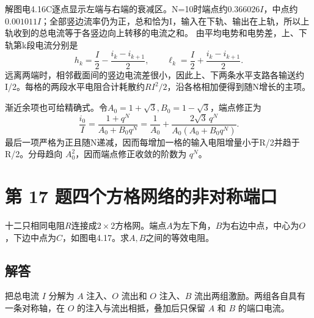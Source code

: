 \documentclass[UTF8,fontset=fandol,a4paper,11pt]{ctexart}
\newcommand{\figcaption}[1]{\par\vspace{2pt}{\small\color{muted}#1}\par}
\begin{document}
解图电4.16C逐点显示左端与右端的衰减区。N=10时端点约$0.366026I$，中点约$0.001011I$；全部竖边流率仍为正，总和恰为I，输入在下轨、输出在上轨，所以上轨收到的总电流等于各竖边向上转移的电流之和。
由平均电势和电势差，上、下轨第k段电流分别是
\[
h_k=\frac I2-\frac{i_k-i_{k+1}}2,\qquad
\ell_k=\frac I2+\frac{i_k-i_{k+1}}2.
\]
远离两端时，相邻截面间的竖边电流差很小，因此上、下两条水平支路各输送约I/2。每格的两段水平电阻合计耗散约$RI^2/2$，沿各格相加便得到随N增长的主项。

渐近余项也可给精确式。令$A_0=1+\sqrt3,B_0=1-\sqrt3$，端点修正为
\[
\frac{i_0}{I}=\frac{1+q^N}{A_0+B_0q^N}
=\frac1{A_0}+\frac{2\sqrt3\,q^N}{A_0(A_0+B_0q^N)}.
\]
最后一项严格为正且随N递减，因而每增加一格的输入电阻增量小于R/2并趋于R/2。分母趋向 $A_0^2$，因而端点修正收敛的阶数为 $q^N$。




\section*{第 17 题\quad 四个方格网络的非对称端口}\label{q:17}

十二只相同电阻$R$连接成$2\times2$方格网。端点$A$为左下角，$B$为右边中点，中心为$O$，下边中点为$C$，如图电4.17。求$A,B$之间的等效电阻。

\begin{center}\begin{minipage}{.98\linewidth}\centering
{}
\figcaption{图电4.17\quad 每一小边为$R$，$B$在右边中点}
\end{minipage}\end{center}

\subsection*{解答}

把总电流 $I$ 分解为 $A$ 注入、$O$ 流出和 $O$ 注入、$B$ 流出两组激励。两组各自具有一条对称轴，在 $O$ 的注入与流出相抵，叠加后只保留 $A$ 和 $B$ 的端口电流。
\end{document}
